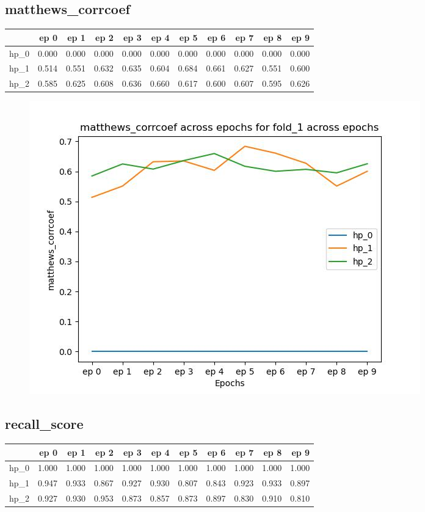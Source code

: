 \documentclass{article}
\begin{document}
\subsection{matthews\_corrcoef}
\begin{tabular}{lrrrrrrrrrr}
\toprule
{} &   ep 0 &   ep 1 &   ep 2 &   ep 3 &   ep 4 &   ep 5 &   ep 6 &   ep 7 &   ep 8 &   ep 9 \\
\midrule
hp\_0 &  0.000 &  0.000 &  0.000 &  0.000 &  0.000 &  0.000 &  0.000 &  0.000 &  0.000 &  0.000 \\
hp\_1 &  0.514 &  0.551 &  0.632 &  0.635 &  0.604 &  0.684 &  0.661 &  0.627 &  0.551 &  0.600 \\
hp\_2 &  0.585 &  0.625 &  0.608 &  0.636 &  0.660 &  0.617 &  0.600 &  0.607 &  0.595 &  0.626 \\
\bottomrule
\end{tabular}

\begin{figure}[H]
\includegraphics[scale = 0.75]{fold_1/matthews_corrcoef}
\end{figure}
\subsection{recall\_score}
\begin{tabular}{lrrrrrrrrrr}
\toprule
{} &   ep 0 &   ep 1 &   ep 2 &   ep 3 &   ep 4 &   ep 5 &   ep 6 &   ep 7 &   ep 8 &   ep 9 \\
\midrule
hp\_0 &  1.000 &  1.000 &  1.000 &  1.000 &  1.000 &  1.000 &  1.000 &  1.000 &  1.000 &  1.000 \\
hp\_1 &  0.947 &  0.933 &  0.867 &  0.927 &  0.930 &  0.807 &  0.843 &  0.923 &  0.933 &  0.897 \\
hp\_2 &  0.927 &  0.930 &  0.953 &  0.873 &  0.857 &  0.873 &  0.897 &  0.830 &  0.910 &  0.810 \\
\bottomrule
\end{tabular}
\end{document}
